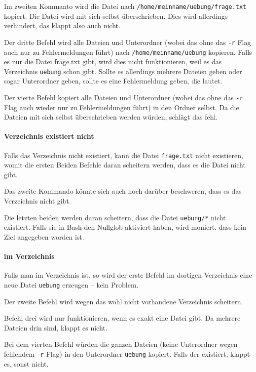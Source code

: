 {Im zweiten Kommanto wird die Datei nach \texttt{/home/meinname/uebung/frage.txt} kopiert. Die Datei wird mit sich selbst überschrieben. Dies wird allerdings verhindert, das klappt also auch nicht.

Der dritte Befehl wird alle Dateien und Unterordner (wobei das ohne das \texttt{-r} Flag auch nur zu Fehlermeldungen führt) nach \texttt{/home/meinname/uebung} kopieren. Falls es nur die Datei frage.txt gibt, wird dies nicht funktionieren, weil es das Verzeichnis \texttt{uebung} schon gibt. Sollte es allerdings mehrere Dateien geben oder sogar Unterordner geben, sollte es eine Fehlermeldung geben, die  lautet.

Der vierte Befehl kopiert alle Dateien und Unterordner (wobei das ohne das \texttt{-r} Flag auch wieder nur zu Fehlermeldungen führt) in den Ordner selbst. Da die Dateien mit sich selbst überschrieben werden würden, schlägt das fehl.

\paragraph*{Verzeichnis existiert nicht} Falls das Verzeichnis nicht existiert, kann die Datei \texttt{frage.txt} nicht existieren, womit die ersten Beiden Befehle daran scheitern werden, dass es die Datei nicht gibt.

Das zweite Kommando könnte sich auch noch darüber beschweren, dass es das Verzeichnis nicht gibt.

Die letzten beiden werden daran scheitern, dass die Datei \texttt{uebung/*} nicht existiert. Falls sie in Bash den Nullglob aktiviert haben, wird moniert, dass kein Ziel angegeben worden ist.

\paragraph*{im Verzeichnis}

Falls man im Verzeichnis ist, so wird der erste Befehl im dortigen Verzeichnis eine neue Datei \texttt{uebung} erzeugen -- kein Problem.

Der zweite Befehl wird wegen das wohl nicht vorhandene Verzeichnis scheitern.

Befehl drei wird nur funktionieren, wenn es exakt eine Datei gibt. Da mehrere Dateien drin sind, klappt es nicht.

Bei dem vierten Befehl würden die ganzen Dateien (keine Unterordner wegen fehlendem \texttt{-r} Flag) in den Unterordner \texttt{uebung} kopiert. Falls der existiert, klappt es, sonst nicht.

}
